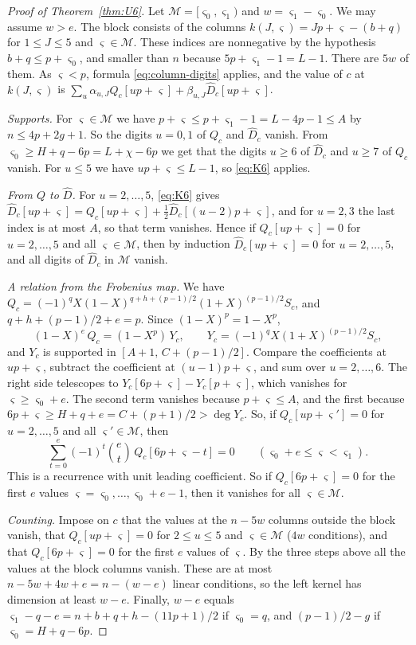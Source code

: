 \documentclass[11pt]{amsart}
\theoremstyle{definition}
\theoremstyle{remark}
\numberwithin{equation}{section}
\begin{document}
\begin{proof}[Proof of Theorem~\ref{thm:U6}]
Let $\mathcal M=[\varsigma_0,\varsigma_1)$ and $w=\varsigma_1-\varsigma_0$. We may assume $w>e$. The block consists of the columns
$k(J,\varsigma)=Jp+\varsigma-(b+q)$ for $1\le J\le5$ and $\varsigma\in \mathcal M$. These indices are nonnegative by the hypothesis
$b+q\le p+\varsigma_0$, and smaller than $n$ because $5p+\varsigma_1-1=L-1$. There are $5w$ of them. As $\varsigma<p$, formula
\eqref{eq:column-digits} applies, and the value of $c$ at $k(J,\varsigma)$ is
$\sum_u\alpha_{u,J}Q_c[up+\varsigma]+\beta_{u,J}\widehat D_c[up+\varsigma]$.

\emph{Supports.} For $\varsigma\in \mathcal M$ we have $p+\varsigma\le p+\varsigma_1-1=L-4p-1\le A$ by $n\le4p+2g+1$. So the digits $u=0,1$
of $Q_c$ and $\widehat D_c$ vanish. From $\varsigma_0\ge H+q-6p=L+\chi-6p$ we get that the digits $u\ge6$ of
$\widehat D_c$ and $u\ge7$ of $Q_c$ vanish. For $u\le5$ we have $up+\varsigma\le L-1$, so \eqref{eq:K6} applies.

\emph{From $Q$ to $\widehat D$.} For $u=2,\dots,5$, \eqref{eq:K6} gives
$\widehat D_c[up+\varsigma]=Q_c[up+\varsigma]+\tfrac12\widehat D_c[(u-2)p+\varsigma]$, and for $u=2,3$ the last index is at most $A$,
so that term vanishes. Hence if $Q_c[up+\varsigma]=0$ for $u=2,\dots,5$ and all $\varsigma\in \mathcal M$, then by induction
$\widehat D_c[up+\varsigma]=0$ for $u=2,\dots,5$, and all digits of $\widehat D_c$ in $\mathcal M$ vanish.

\emph{A relation from the Frobenius map.} We have
$Q_c=(-1)^qX(1-X)^{q+h+(p-1)/2}(1+X)^{(p-1)/2}S_c$, and $q+h+(p-1)/2+e=p$. Since $(1-X)^p=1-X^p$,
\[
 (1-X)^e\,Q_c=(1-X^p)\,Y_c,\qquad Y_c=(-1)^qX(1+X)^{(p-1)/2}S_c,
\]
and $Y_c$ is supported in $[A+1,\,C+(p-1)/2]$. Compare the coefficients at $up+\varsigma$, subtract the
coefficient at $(u-1)p+\varsigma$, and sum over $u=2,\dots,6$. The right side telescopes to
$Y_c[6p+\varsigma]-Y_c[p+\varsigma]$, which vanishes for $\varsigma\ge\varsigma_0+e$. The second term vanishes because $p+\varsigma\le A$,
and the first because $6p+\varsigma\ge H+q+e=C+(p+1)/2>\deg Y_c$. So, if $Q_c[up+\varsigma']=0$ for $u=2,\dots,5$ and all
$\varsigma'\in \mathcal M$, then
\[
 \sum_{t=0}^e(-1)^t\binom et\,Q_c[6p+\varsigma-t]=0\qquad(\varsigma_0+e\le\varsigma<\varsigma_1).
\]
This is a recurrence with unit leading coefficient. So if $Q_c[6p+\varsigma]=0$ for the first $e$ values
$\varsigma=\varsigma_0,\dots,\varsigma_0+e-1$, then it vanishes for all $\varsigma\in \mathcal M$.

\emph{Counting.} Impose on $c$ that the values at the $n-5w$ columns outside the block vanish, that
$Q_c[up+\varsigma]=0$ for $2\le u\le5$ and $\varsigma\in \mathcal M$ ($4w$ conditions), and that $Q_c[6p+\varsigma]=0$ for the first $e$
values of $\varsigma$. By the three steps above all the values at the block columns vanish. These are at most
$n-5w+4w+e=n-(w-e)$ linear conditions, so the left kernel has dimension at least $w-e$. Finally, $w-e$
equals $\varsigma_1-q-e=n+b+q+h-(11p+1)/2$ if $\varsigma_0=q$, and $(p-1)/2-g$ if $\varsigma_0=H+q-6p$.
\end{proof}
\end{document}
